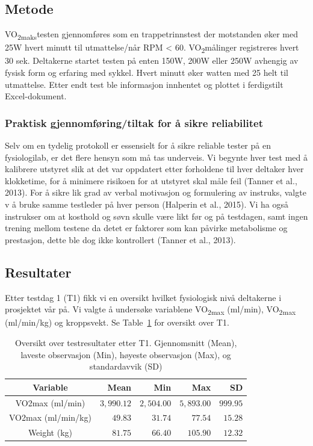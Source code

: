 \documentclass[
  letterpaper,
  DIV=11,
  numbers=noendperiod]{scrartcl}
\begin{document}
\hypertarget{metode}{%
\subsection{Metode}\label{metode}}

VO\textsubscript{2maks}testen gjennomføres som en trappetrinnstest der
motstanden øker med 25W hvert minutt til utmattelse/når RPM \textless{}
60. VO\textsubscript{2}målinger registreres hvert 30 sek. Deltakerne
startet testen på enten 150W, 200W eller 250W avhengig av fysisk form og
erfaring med sykkel. Hvert minutt øker watten med 25 helt til
utmattelse. Etter endt test ble informasjon innhentet og plottet i
ferdigstilt Excel-dokument. \newpage

\hypertarget{praktisk-gjennomfuxf8ringtiltak-for-uxe5-sikre-reliabilitet}{%
\subsubsection{Praktisk gjennomføring/tiltak for å sikre
reliabilitet}\label{praktisk-gjennomfuxf8ringtiltak-for-uxe5-sikre-reliabilitet}}

Selv om en tydelig protokoll er essensielt for å sikre reliable tester
på en fysiologilab, er det flere hensyn som må tas underveis. Vi begynte
hver test med å kalibrere utstyret slik at det var oppdatert etter
forholdene til hver deltaker hver klokketime, for å minimere risikoen
for at utstyret skal måle feil (Tanner et al., 2013). For å sikre lik
grad av verbal motivasjon og formulering av instruks, valgte v å bruke
samme testleder på hver person (Halperin et al., 2015). Vi ha også
instrukser om at kosthold og søvn skulle være likt før og på testdagen,
samt ingen trening mellom testene da detet er faktorer som kan påvirke
metabolisme og prestasjon, dette ble dog ikke kontrollert (Tanner et
al., 2013).

\hypertarget{resultater}{%
\subsection{Resultater}\label{resultater}}

Etter testdag 1 (T1) fikk vi en oversikt hvilket fysiologisk nivå
deltakerne i prosjektet vår på. Vi valgte å undersøke variablene
VO\textsubscript{2max} (ml/min), VO\textsubscript{2max} (ml/min/kg) og
kroppsvekt. Se Table~\ref{tbl-over} for oversikt over T1.

\hypertarget{tbl-over}{}
\begin{longtable}{crrrr}
\caption{\label{tbl-over}Oversikt over testresultater etter T1. Gjennomsnitt (Mean), laveste
observasjon (Min), høyeste observasjon (Max), og standardavvik (SD) }\tabularnewline

\toprule
Variable & Mean & Min & Max & SD \\ 
\midrule\addlinespace[2.5pt]
VO2max (ml/min) & $3,990.12$ & $2,504.00$ & $5,893.00$ & $999.95$ \\ 
VO2max (ml/min/kg) & $49.83$ & $31.74$ & $77.54$ & $15.28$ \\ 
Weight (kg) & $81.75$ & $66.40$ & $105.90$ & $12.32$ \\ 
\bottomrule
\end{longtable}
\end{document}
